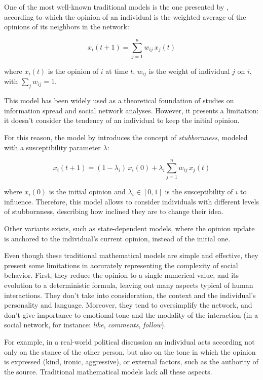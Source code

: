 One of the most well-known traditional models is the one presented by \citet{Degroot1974}, according to which the opinion of an individual is the weighted average of the opinions of its neighbors in the network:

\[
x_i(t+1) = \sum_{j=1}^n w_{ij} \, x_j(t)
\]

where $x_i(t)$ is the opinion of $i$ at time $t$, $w_{ij}$ is the weight of individual $j$ on $i$, with $\sum_{j} w_{ij}=1$.

This model has been widely used as a theoretical foundation of studies on information spread and social network analyses. However, it presents a limitation: it doesn’t consider the tendency of an individual to keep the initial opinion.

For this reason, the model by \citet{friedkin_1990} introduces the concept of \textit{stubbornness}, modeled with a susceptibility parameter $\lambda$:

\[
x_i(t+1) = (1 - \lambda_i) \, x_i(0) + \lambda_i \sum_{j=1}^n w_{ij} \, x_j(t)
\]

where $x_i(0)$ is the initial opinion and $\lambda_i \in [0, 1]$ is the susceptibility of $i$ to influence.
Therefore, this model allows to consider individuals with different levels of stubbornness, describing how inclined they are to change their idea.

Other variants exists, such as state-dependent models, where the opinion update is anchored to the individual's current opinion, instead of the initial one.


\medskip
Even though these traditional mathematical models are simple and effective, they present some limitations in accurately representing the complexity of social behavior.
First, they reduce the opinion to a single numerical value, and its evolution to a deterministic formula, leaving out many aspects typical of human interactions.
They don't take into consideration, the context and the individual's personality and language.
Moreover, they tend to oversimplify the network, and don't give importance to emotional tone and the modality of the interaction (in a social network, for instance: \textit{like}, \textit{comments}, \textit{follow}).

For example, in a real-world political discussion an individual acts according not only on the stance of the other person, but also on the tone in which the opinion is expressed (kind, ironic, aggressive), or external factors, such as the authority of the source.
Traditional mathematical models lack all these aspects.


